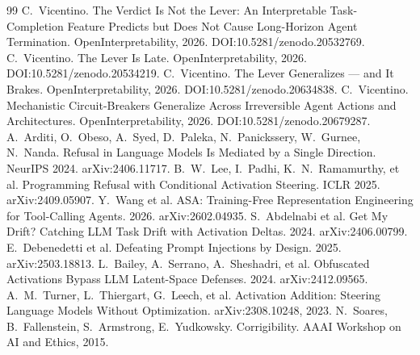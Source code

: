 \documentclass[11pt]{article}
\begin{document}
\begin{thebibliography}{99}
 C.~Vicentino. The Verdict Is Not the Lever: An Interpretable Task-Completion Feature Predicts but Does Not Cause Long-Horizon Agent Termination. OpenInterpretability, 2026. DOI:10.5281/zenodo.20532769.
 C.~Vicentino. The Lever Is Late. OpenInterpretability, 2026. DOI:10.5281/zenodo.20534219.
 C.~Vicentino. The Lever Generalizes --- and It Brakes. OpenInterpretability, 2026. DOI:10.5281/zenodo.20634838.
 C.~Vicentino. Mechanistic Circuit-Breakers Generalize Across Irreversible Agent Actions and Architectures. OpenInterpretability, 2026. DOI:10.5281/zenodo.20679287.
 A.~Arditi, O.~Obeso, A.~Syed, D.~Paleka, N.~Panickssery, W.~Gurnee, N.~Nanda. Refusal in Language Models Is Mediated by a Single Direction. NeurIPS 2024. arXiv:2406.11717.
 B.~W.~Lee, I.~Padhi, K.~N.~Ramamurthy, et al. Programming Refusal with Conditional Activation Steering. ICLR 2025. arXiv:2409.05907.
 Y.~Wang et al. ASA: Training-Free Representation Engineering for Tool-Calling Agents. 2026. arXiv:2602.04935.
 S.~Abdelnabi et al. Get My Drift? Catching LLM Task Drift with Activation Deltas. 2024. arXiv:2406.00799.
 E.~Debenedetti et al. Defeating Prompt Injections by Design. 2025. arXiv:2503.18813.
 L.~Bailey, A.~Serrano, A.~Sheshadri, et al. Obfuscated Activations Bypass LLM Latent-Space Defenses. 2024. arXiv:2412.09565.
 A.~M.~Turner, L.~Thiergart, G.~Leech, et al. Activation Addition: Steering Language Models Without Optimization. arXiv:2308.10248, 2023.
 N.~Soares, B.~Fallenstein, S.~Armstrong, E.~Yudkowsky. Corrigibility. AAAI Workshop on AI and Ethics, 2015.
\end{thebibliography}
\end{document}
